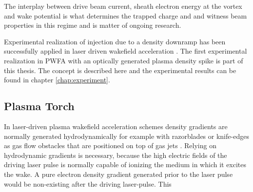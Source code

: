 The interplay between drive beam current, sheath electron energy at the vortex and wake potential is what determines the trapped charge and and witness beam properties in this regime and is matter of ongoing research.


Experimental realization of injection due to a density downramp has been successfully applied in laser driven wakefield acceleration \cite{GeddesDensityGradientInjectionPRL2008,schmid2010densityPRSTAB2010,gonsalves2011NatureTunableDensity}
. 
The first experimental realization in PWFA with an optically generated plasma density spike is part of this thesis. The concept is described here and the experimental results can be found in  chapter \ref{chap:experiment}.

\subsection{Plasma Torch}
\label{sec:PlaTo}
In laser-driven plasma wakefield acceleration schemes density gradients are normally generated hydrodynamically for example with razorblades or knife-edges as gas flow obstacles that are positioned on top of gas jets \cite{buck2013shock,schmid2010density}. Relying on hydrodynamic gradients is necessary, because the high electric fields of the driving laser pulse is normally capable of ionizing the medium in which it excites the wake. A pure electron density gradient generated prior to the laser pulse would be non-existing after the driving laser-pulse. This 

